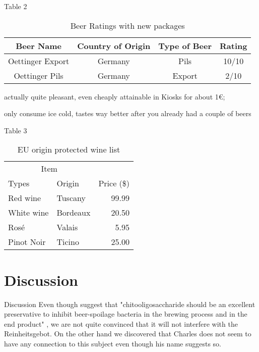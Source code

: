 \documentclass[10pt]{beamer}
\begin{document}
\begin{frame}{Table 2}
\begin{table}[h]
\begin{center}
\begin{threeparttable}
\begin{tabular}{c c c c}
    \toprule
    \textbf{Beer Name} & \textbf{Country of Origin} & \textbf{Type of Beer} & \textbf{Rating} \\ 
    \midrule
      Oettinger Export\tnote{1}   & Germany & Pils & 10/10 \\
      Oettinger Pils\tnote{2}   & Germany & Export & 2/10 \\ 
      \bottomrule
\end{tabular}
\begin{tablenotes}
\item[1] \footnotesize actually quite pleasant, even cheaply attainable in Kiosks for about 1€; \item[2] \footnotesize only consume ice cold, tastes way better after you already had a couple of beers
\end{tablenotes}
\end{threeparttable}
\end{center}
\caption{Beer Ratings with new packages}{}
\label{table:2}
\end{table}
\end{frame}

\begin{frame}{Table 3}
\begin{table}[h]
\centering
\begin{tabular}{llr}
\hline
\multicolumn{2}{c}{Item} \\
\cline{1-2}
Types    & Origin & Price (\$) \\
\hline
Red wine      & Tuscany     & 99.99      \\
White wine       & Bordeaux     & 20.50      \\
Rosé       & Valais     & 5.95      \\
Pinot Noir & Ticino      & 25.00       \\
\hline
\end{tabular}
\caption{EU origin protected wine list}
 \label{table:3}
\end{table}
\end{frame}

\section{Discussion}
\begin{frame}{Discussion}
Even though \cite{Zhao2015} suggest that "chitooligosaccharide should be an excellent preservative to inhibit beer-spoilage bacteria in the brewing process and in the end product" , we are not quite convinced that it will not interfere with the Reinheitsgebot. On the other hand we discovered that Charles \cite{Beer2003} does not seem to have any connection to this subject even though his name suggests so.
\end{frame} 
\end{document}
